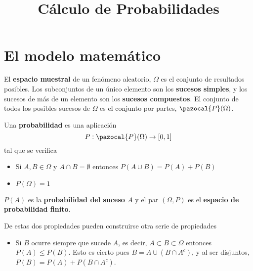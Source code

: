 \documentclass[a4paper, 11pt]{extarticle}
\date{}
\title{\Huge\vspace{-1em}Cálculo de Probabilidades}
\let\mathcal\pazocal
\begin{document}
\maketitle
\vspace{-8em}


\section*{El modelo matemático}
\label{sec:orgd93670c}
\begin{multicols*}{2}
\vspace{-1.5em}
El \textbf{espacio muestral} de un fenómeno aleatorio, \(\Omega\) es el conjunto
de resultados posibles. Los subconjuntos de un único elemento son los 
\textbf{sucesos simples}, y los sucesos de más de un elemento son los \textbf{sucesos compuestos}.
El conjunto de todos los posibles sucesos de \(\Omega\) es el conjunto
por partes, \(\mathcal{P}(\Omega)\).

Una \textbf{probabilidad} es una aplicación 
\[ P: \mathcal{P}(\Omega) \rightarrow [0,1] \]
tal que se verifica

\begin{itemize}
\item Si \(A,B \in \Omega\) y \(A \cap B = \emptyset\) entonces \(P(A \cup B) = P(A) + P(B)\)

\item \(P(\Omega) = 1\)
\end{itemize}

\(P(A)\) es la \textbf{probabilidad del suceso \(A\)} y el par \((\Omega, P)\) es
el \textbf{espacio de probabilidad finito}. 

De estas dos propiedades pueden construirse otra serie de propiedades
\begin{itemize}
\item Si \(B\) ocurre siempre que sucede \(A\), es decir, \(A \subset B \subset \Omega\) entonces \(P(A) \le P(B)\). Esto es cierto pues \(B = A \cup (B \cap
  A^c)\), y al ser disjuntos, \(P(B) = P(A) + P(B \cap A^c)\).


\end{itemize}
\end{multicols*}
\end{document}
